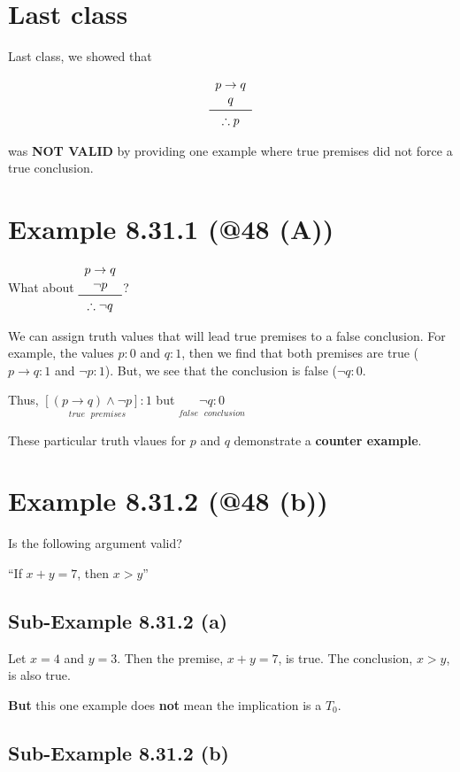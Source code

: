 \documentclass{article}
\newcommand{\onespace}{\text{ }}
\newcommand{\logicrule}[2]{
\begin{array}{c}
#1 \\
\midrule
\therefore #2 \\
\end{array}
}
\begin{document}
\section*{Last class}

Last class, we showed that

\[
\logicrule{p\rightarrow q \\ q}{p}
\]

was \textbf{NOT VALID} by providing one example where true premises
did not force a true conclusion.

\section*{Example 8.31.1 (@48 (A))}

What about $\logicrule{p\rightarrow{}q\\\neg{}p}{\neg{}q}$?

We can assign truth values that will lead true premises to a false
conclusion. For example, the values $p:0$ and $q:1$, then we find that
both premises are true ($p\rightarrow{}q:1$ and $\neg{}p:1$). But, we
see that the conclusion is false ($\neg{}q:0$.

Thus,
$\underset{true\onespace{}premises}{\left\lbrack(p\rightarrow{}q)\wedge\neg{}p\right\rbrack:1}$
but $\underset{false\onespace{}conclusion}{\neg{}q:0}$

These particular truth vlaues for $p$ and $q$ demonstrate a
\textbf{counter example}.

\section*{Example 8.31.2 (@48 (b))}

Is the following argument valid?

``If $x+y=7$, then $x>y$''

\subsection*{Sub-Example 8.31.2 (a)}

Let $x=4$ and $y=3$. Then the premise, $x+y=7$, is true. The
conclusion, $x>y$, is also true.

\textbf{But} this one example does \textbf{not} mean the implication
is a $T_0$.

\subsection*{Sub-Example 8.31.2 (b)}
\end{document}
